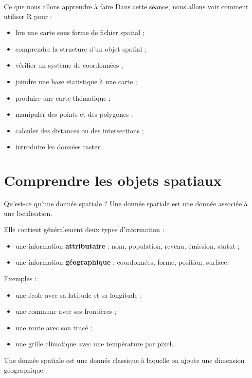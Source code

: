 \documentclass[
  10pt,
  ignorenonframetext,
]{beamer}
\begin{document}
\begin{frame}{Ce que nous allons apprendre à faire}
\label{ce-que-nous-allons-apprendre-uxe0-faire}
Dans cette séance, nous allons voir comment utiliser R pour :

\begin{itemize}
  \item lire une carte sous forme de fichier spatial ;
  \item comprendre la structure d’un objet spatial ;
  \item vérifier un système de coordonnées ;
  \item joindre une base statistique à une carte ;
  \item produire une carte thématique ;
  \item manipuler des points et des polygones ;
  \item calculer des distances ou des intersections ;
  \item introduire les données raster.
\end{itemize}
\end{frame}

\section{Comprendre les objets
spatiaux}\label{comprendre-les-objets-spatiaux}

\begin{frame}{Qu'est-ce qu'une donnée spatiale ?}
\label{quest-ce-quune-donnuxe9e-spatiale}
Une donnée spatiale est une donnée associée à une localisation.

Elle contient généralement deux types d'information :

\begin{itemize}
  \item une information \textbf{attributaire} : nom, population, revenu, émission, statut ;
  \item une information \textbf{géographique} : coordonnées, forme, position, surface.
\end{itemize}

Exemples :

\begin{itemize}
  \item une école avec sa latitude et sa longitude ;
  \item une commune avec ses frontières ;
  \item une route avec son tracé ;
  \item une grille climatique avec une température par pixel.
\end{itemize}

Une donnée spatiale est une donnée classique à laquelle on ajoute une
dimension géographique.
\end{frame}
\end{document}
